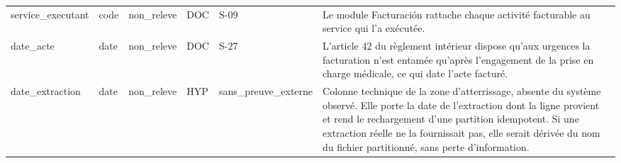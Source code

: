 \begin{longtable}{p{2.5cm}p{1.8cm}p{2.8cm}p{1.3cm}p{2.2cm}p{5cm}}
service\_executant & code & non\_releve & DOC & S-09 & Le module Facturación rattache chaque activité facturable au service qui l'a exécutée. \\
date\_acte & date & non\_releve & DOC & S-27 & L'article 42 du règlement intérieur dispose qu'aux urgences la facturation n'est entamée qu'après l'engagement de la prise en charge médicale, ce qui date l'acte facturé. \\
date\_extraction & date & non\_releve & HYP & sans\_preuve\_externe & Colonne technique de la zone d'atterrissage, absente du système observé. Elle porte la date de l'extraction dont la ligne provient et rend le rechargement d'une partition idempotent. Si une extraction réelle ne la fournissait pas, elle serait dérivée du nom du fichier partitionné, sans perte d'information. \\
\hline
\end{longtable}

